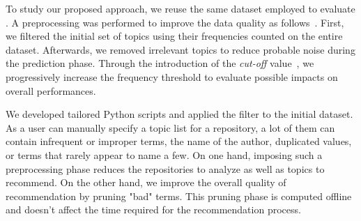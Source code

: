 




To study our proposed approach, we reuse the same dataset employed to evaluate \MNB \cite{MNBreplication}. A preprocessing was performed to improve the data quality as follows~\cite{repo-topix}. First, we filtered the initial set of topics using their frequencies counted on the entire \GH dataset. Afterwards, we removed irrelevant topics to reduce probable noise during the prediction phase. Through the introduction of the \emph{cut-off} value~\cite{10.1145/3383219.3383227}, we progressively increase the frequency threshold to evaluate possible impacts on overall performances. %


We developed tailored Python scripts and applied the filter to the initial dataset. As a \GH user can manually specify a topic list for a repository, a lot of them can contain infrequent or improper terms, \ie the name of the author, duplicated values, or terms that rarely appear to name a few. On one hand, imposing such a preprocessing phase reduces the repositories to analyze as well as topics to recommend. On the other hand, we improve the overall quality of recommendation by pruning "bad" terms. 
This pruning phase is computed offline and doesn't affect the time required for the recommendation process. 

